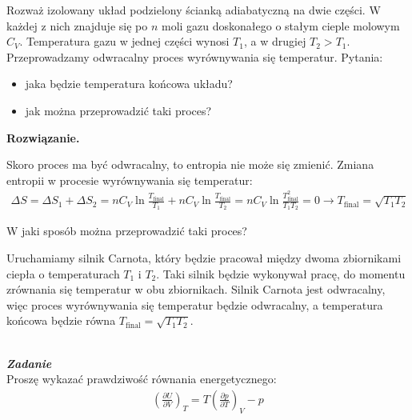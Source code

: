 \documentclass[11pt,a4paper]{article}
\newcommand{\Partial}[3]{\left( \frac{\partial #1}{\partial #2} \right)_{#3}}
\newcounter{zadanie}\newcommand{\zadanie}[1][]{\addtocounter{zadanie}{1} ~\\ {\bf \emph{Zadanie \arabic{zadanie} #1 }} \\}
\newenvironment{solution}{\vspace{1cm} \par\textbf{Rozwiązanie.} \vspace{1cm}}{}
\begin{document}
Rozważ izolowany układ podzielony ścianką adiabatyczną na dwie części. 
W każdej z nich znajduje się po $n$ moli gazu doskonałego o stałym cieple molowym $C_V$. 
Temperatura gazu w jednej części wynosi $T_1$, a w drugiej $T_2 > T_1$. 
Przeprowadzamy odwracalny proces wyrównywania się temperatur. Pytania:
\begin{itemize}
  \item jaka będzie temperatura końcowa układu? 
  \item jak można przeprowadzić taki proces?
\end{itemize}

\begin{solution}

Skoro proces ma być odwracalny, to entropia nie może się zmienić.
Zmiana entropii w procesie wyrównywania się temperatur: 
\begin{align*}
  \Delta S = \Delta S_1 + \Delta S_2 =
  n C_V \ln \frac{T_{\text{final}}}{T_1} + n C_V \ln \frac{T_{\text{final}}}{T_2} = 
  n C_V \ln \frac{T_{\text{final}}^2}{T_1 T_2} = 0 \to 
  T_{\text{final}} = \sqrt{T_1 T_2}
\end{align*}

W jaki sposób można przeprowadzić taki proces? 

Uruchamiamy silnik Carnota, który będzie pracował między dwoma zbiornikami 
ciepła o temperaturach $T_1$ i $T_2$. Taki silnik będzie wykonywał pracę, 
do momentu zrównania się temperatur w obu zbiornikach. Silnik Carnota jest 
odwracalny, więc proces wyrównywania się temperatur będzie odwracalny, a 
temperatura końcowa będzie równa $T_{\text{final}} = \sqrt{T_1 T_2}$.

\newpage   
\end{solution}
\zadanie[]

Proszę wykazać prawdziwość równania energetycznego:
\begin{align*}
  \Partial{U}{V}{T} = T\Partial{p}{T}{V} - p
\end{align*}
\end{document}
